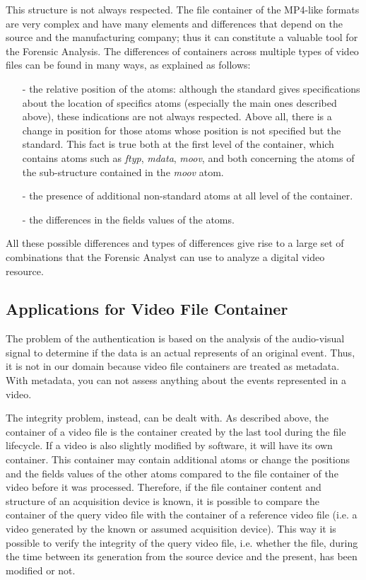 This structure is not always respected. The file container of the MP4-like formats are very complex and have many elements and differences that depend on the source and the manufacturing company; thus it can constitute a valuable tool for the Forensic Analysis.
The differences of containers across multiple types of video files can be found in many ways, as explained as follows:
\begin{itemize}
\item[-] the relative position of the atoms: although the standard gives specifications about the location of specifics atoms (especially the main ones described above), these indications are not always respected. Above all, there is a change in position for those atoms whose position is not specified but the standard. This fact is true both at the first level of the container, which contains atoms such as \emph{ftyp}, \emph{mdata}, \emph{moov}, and both concerning the atoms of the sub-structure contained in the \emph{moov} atom.
\item[-] the presence of additional non-standard atoms at all level of the container.
\item[-] the differences in the fields values of the atoms.
\end{itemize}

All these possible differences and types of differences give rise to a large set of combinations that the Forensic Analyst can use to analyze a digital video resource.

\subsection{Applications for Video File Container}

The problem of the authentication is based on the analysis of the audio-visual signal to determine if the data is an actual represents of an original event. Thus, it is not in our domain because video file containers are treated as metadata. With metadata, you can not assess anything about the events represented in a video.

The integrity problem, instead, can be dealt with. As described above, the container of a video file is the container created by the last tool during the file lifecycle. If a video is also slightly modified by software, it will have its own container. This container may contain additional atoms or change the positions and the fields values of the other atoms compared to the file container of the video before it was processed. Therefore, if the file container content and structure of an acquisition device is known, it is possible to compare the container of the query video file with the container of a reference video file (i.e. a video generated by the known or assumed acquisition device). This way it is possible to verify the integrity of the query video file, i.e. whether the file, during the time between its generation from the source device and the present, has been modified or not.

